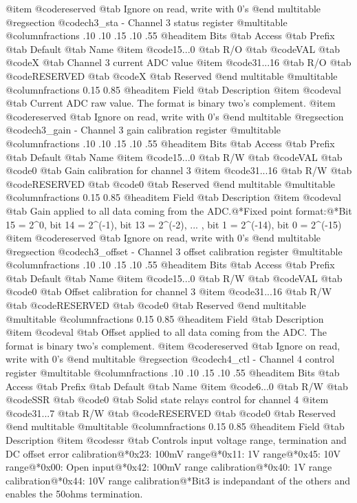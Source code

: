 @item @code{reserved} @tab Ignore on read, write with 0's
@end multitable
@regsection @code{ch3_sta} - Channel 3 status register
@multitable @columnfractions .10 .10 .15 .10 .55
@headitem Bits @tab Access @tab Prefix @tab Default @tab Name
@item @code{15...0}
@tab R/O @tab
@code{VAL}
@tab @code{X} @tab 
Channel 3 current ADC value
@item @code{31...16}
@tab R/O @tab
@code{RESERVED}
@tab @code{X} @tab 
Reserved
@end multitable
@multitable @columnfractions 0.15 0.85
@headitem Field @tab Description
@item @code{val} @tab Current ADC raw value. The format is binary two's complement.
@item @code{reserved} @tab Ignore on read, write with 0's
@end multitable
@regsection @code{ch3_gain} - Channel 3 gain calibration register
@multitable @columnfractions .10 .10 .15 .10 .55
@headitem Bits @tab Access @tab Prefix @tab Default @tab Name
@item @code{15...0}
@tab R/W @tab
@code{VAL}
@tab @code{0} @tab 
Gain calibration for channel 3
@item @code{31...16}
@tab R/W @tab
@code{RESERVED}
@tab @code{0} @tab 
Reserved
@end multitable
@multitable @columnfractions 0.15 0.85
@headitem Field @tab Description
@item @code{val} @tab Gain applied to all data coming from the ADC.@*Fixed point format:@*Bit 15 = 2^0, bit 14 = 2^(-1), bit 13 = 2^(-2), ... , bit 1 = 2^(-14), bit 0 = 2^(-15)
@item @code{reserved} @tab Ignore on read, write with 0's
@end multitable
@regsection @code{ch3_offset} - Channel 3 offset calibration register
@multitable @columnfractions .10 .10 .15 .10 .55
@headitem Bits @tab Access @tab Prefix @tab Default @tab Name
@item @code{15...0}
@tab R/W @tab
@code{VAL}
@tab @code{0} @tab 
Offset calibration for channel 3
@item @code{31...16}
@tab R/W @tab
@code{RESERVED}
@tab @code{0} @tab 
Reserved
@end multitable
@multitable @columnfractions 0.15 0.85
@headitem Field @tab Description
@item @code{val} @tab Offset applied to all data coming from the ADC. The format is binary two's complement.
@item @code{reserved} @tab Ignore on read, write with 0's
@end multitable
@regsection @code{ch4_ctl} - Channel 4 control register
@multitable @columnfractions .10 .10 .15 .10 .55
@headitem Bits @tab Access @tab Prefix @tab Default @tab Name
@item @code{6...0}
@tab R/W @tab
@code{SSR}
@tab @code{0} @tab 
Solid state relays control for channel 4
@item @code{31...7}
@tab R/W @tab
@code{RESERVED}
@tab @code{0} @tab 
Reserved
@end multitable
@multitable @columnfractions 0.15 0.85
@headitem Field @tab Description
@item @code{ssr} @tab Controls input voltage range, termination and DC offset error calibration@*0x23: 100mV range@*0x11: 1V range@*0x45: 10V range@*0x00: Open input@*0x42: 100mV range calibration@*0x40: 1V range calibration@*0x44: 10V range calibration@*Bit3 is indepandant of the others and enables the 50ohms termination.
